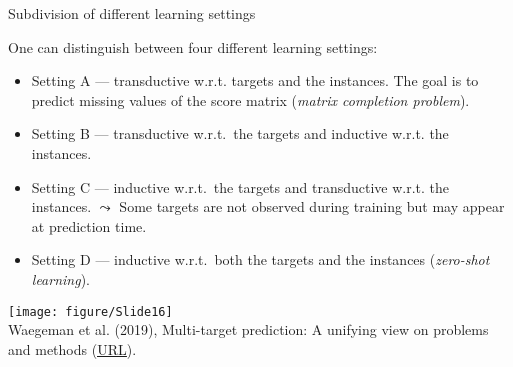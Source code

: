 \documentclass[11pt,compress,t,notes=noshow, xcolor=table]{beamer}
\begin{document}
\begin{frame}{Subdivision of different learning settings}

	\footnotesize
	One can distinguish between four different learning settings:

	\begin{itemize} \footnotesize
	
		\item Setting A --- transductive w.r.t. targets and the instances. The goal is to predict missing values of the score matrix (\emph{matrix completion problem}).
        \vspace{10pt}

		\item Setting B --- transductive w.r.t.\ the targets and inductive w.r.t. the instances.
        \vspace{10pt}

	\end{itemize}

	\begin{minipage}{0.55\textwidth}
		\begin{itemize} \footnotesize
			\item Setting C --- inductive w.r.t.\ the targets and transductive w.r.t. the instances. $\leadsto$ Some targets are not observed during training but may appear at prediction time.
            \vspace{10pt}

			\item Setting D --- inductive w.r.t.\ both the targets and the instances (\emph{zero-shot learning}).
            \vspace{10pt}
            
		\end{itemize}
	\end{minipage}
    \hfill
	\begin{minipage}{0.4\textwidth}
	   \center
	   \texttt{[image: figure/Slide16]}  \tiny
	   \\ Waegeman et al. (2019), Multi-target prediction: A unifying view on problems and methods (\href{https://arxiv.org/pdf/1809.02352.pdf}{\underline{URL}}).
	\end{minipage}
\end{frame}



%
\endlecture
\end{document}

